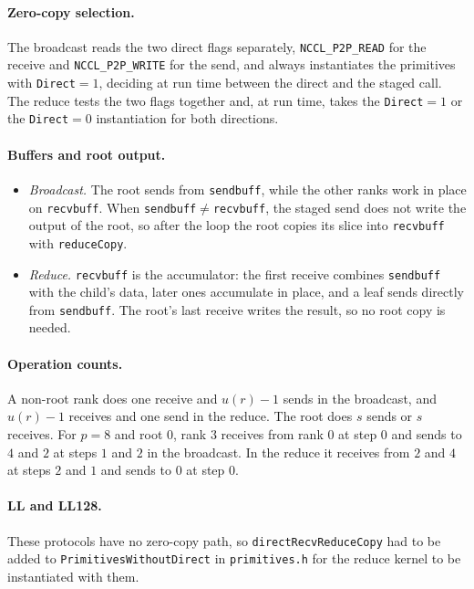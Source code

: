 \paragraph{Zero-copy selection.}
The broadcast reads the two direct flags separately, \texttt{NCCL\_P2P\_READ} for the receive and \texttt{NCCL\_P2P\_WRITE} for the send, and always instantiates the primitives with \texttt{Direct}$=1$, deciding at run time between the direct and the staged call.
The reduce tests the two flags together and, at run time, takes the \texttt{Direct}$=1$ or the \texttt{Direct}$=0$ instantiation for both directions.

\paragraph{Buffers and root output.}
\begin{itemize}
  \item \emph{Broadcast.} The root sends from \texttt{sendbuff}, while the other ranks work in place on \texttt{recvbuff}. When \texttt{sendbuff}$\neq$\texttt{recvbuff}, the staged send does not write the output of the root, so after the loop the root copies its slice into \texttt{recvbuff} with \texttt{reduceCopy}.
  \item \emph{Reduce.} \texttt{recvbuff} is the accumulator: the first receive combines \texttt{sendbuff} with the child's data, later ones accumulate in place, and a leaf sends directly from \texttt{sendbuff}. The root's last receive writes the result, so no root copy is needed.
\end{itemize}

\paragraph{Operation counts.}
A non-root rank does one receive and $u(r)-1$ sends in the broadcast, and $u(r)-1$ receives and one send in the reduce. The root does $s$ sends or $s$ receives.
For $p=8$ and root $0$, rank $3$ receives from rank $0$ at step $0$ and sends to $4$ and $2$ at steps $1$ and $2$ in the broadcast. In the reduce it receives from $2$ and $4$ at steps $2$ and $1$ and sends to $0$ at step $0$.

\paragraph{LL and LL128.}
These protocols have no zero-copy path, so \texttt{directRecv\brk{}Reduce\brk{}Copy} had to be added to \texttt{Primitives\brk{}Without\brk{}Direct} in \texttt{primitives.h} for the reduce kernel to be instantiated with them.

